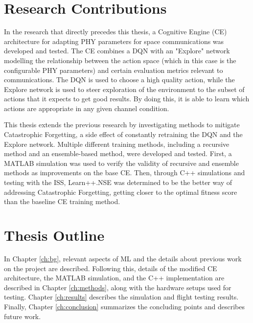 \section{Research Contributions}
\par In the research that directly precedes this thesis\cite{paulo_theory_paper}\cite{tim_implementation_paper}, a Cognitive Engine (CE) architecture for adapting PHY parameters for space communications was developed and tested. The CE combines a DQN with an "Explore" network modelling the relationship between the action space (which in this case is the configurable PHY parameters) and certain evaluation metrics relevant to communications. The DQN is used to choose a high quality action, while the Explore network is used to steer exploration of the environment to the subset of actions that it expects to get good results. By doing this, it is able to learn which actions are appropriate in any given channel condition.  
\par This thesis extends the previous research by investigating methods to mitigate Catastrophic Forgetting, a side effect of constantly retraining the DQN and the Explore network. Multiple different training methods, including a recursive method and an ensemble-based method, were developed and tested. First, a MATLAB simulation was used to verify the validity of recursive and ensemble methods as improvements on the base CE. Then, through C++ simulations and testing with the ISS, Learn++.NSE was determined to be the better way of addressing Catastrophic Forgetting, getting closer to the optimal fitness score than the baseline CE training method. 

\section{Thesis Outline}
\par In Chapter \ref{ch:bg}, relevant aspects of ML and the details about previous work on the project are described. Following this, details of the modified CE architecture, the MATLAB simulation, and the C++ implementation are described in Chapter \ref{ch:methods}, along with the hardware setups used for testing. Chapter \ref{ch:results} describes the simulation and flight testing results. Finally, Chapter \ref{ch:conclusion} summarizes the concluding points and describes future work.
